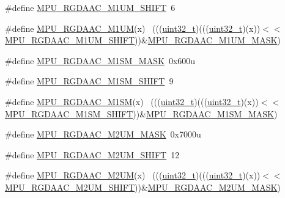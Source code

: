 \begin{DoxyCompactItemize}
\item 
\#define \hyperlink{group___m_p_u___register___masks_gab78a3ecaa69ce9b7a985e4efa7b4620d}{M\+P\+U\+\_\+\+R\+G\+D\+A\+A\+C\+\_\+\+M1\+U\+M\+\_\+\+S\+H\+I\+FT}~6
\item 
\#define \hyperlink{group___m_p_u___register___masks_ga53c71a1269e004bbdd91060144767525}{M\+P\+U\+\_\+\+R\+G\+D\+A\+A\+C\+\_\+\+M1\+UM}(x)                                          ~(((\hyperlink{_p_e___types_8h_a33594304e786b158f3fb30289278f5af}{uint32\+\_\+t})(((\hyperlink{_p_e___types_8h_a33594304e786b158f3fb30289278f5af}{uint32\+\_\+t})(x))$<$$<$\hyperlink{group___m_p_u___register___masks_gab78a3ecaa69ce9b7a985e4efa7b4620d}{M\+P\+U\+\_\+\+R\+G\+D\+A\+A\+C\+\_\+\+M1\+U\+M\+\_\+\+S\+H\+I\+FT}))\&\hyperlink{group___m_p_u___register___masks_ga9c612a4add9fc4bd1e8866fe06d5a0f0}{M\+P\+U\+\_\+\+R\+G\+D\+A\+A\+C\+\_\+\+M1\+U\+M\+\_\+\+M\+A\+SK})
\item 
\#define \hyperlink{group___m_p_u___register___masks_gae1b8caa92c79f5d2c8063322a5648949}{M\+P\+U\+\_\+\+R\+G\+D\+A\+A\+C\+\_\+\+M1\+S\+M\+\_\+\+M\+A\+SK}~0x600u
\item 
\#define \hyperlink{group___m_p_u___register___masks_gaa7b953ee18610f335e223411d85d8cfa}{M\+P\+U\+\_\+\+R\+G\+D\+A\+A\+C\+\_\+\+M1\+S\+M\+\_\+\+S\+H\+I\+FT}~9
\item 
\#define \hyperlink{group___m_p_u___register___masks_ga5689e7ead576f5f6f11da872e038692e}{M\+P\+U\+\_\+\+R\+G\+D\+A\+A\+C\+\_\+\+M1\+SM}(x)                                          ~(((\hyperlink{_p_e___types_8h_a33594304e786b158f3fb30289278f5af}{uint32\+\_\+t})(((\hyperlink{_p_e___types_8h_a33594304e786b158f3fb30289278f5af}{uint32\+\_\+t})(x))$<$$<$\hyperlink{group___m_p_u___register___masks_gaa7b953ee18610f335e223411d85d8cfa}{M\+P\+U\+\_\+\+R\+G\+D\+A\+A\+C\+\_\+\+M1\+S\+M\+\_\+\+S\+H\+I\+FT}))\&\hyperlink{group___m_p_u___register___masks_gae1b8caa92c79f5d2c8063322a5648949}{M\+P\+U\+\_\+\+R\+G\+D\+A\+A\+C\+\_\+\+M1\+S\+M\+\_\+\+M\+A\+SK})
\item 
\#define \hyperlink{group___m_p_u___register___masks_ga8d7b4cc87aa01ac1fc57eee990df39c7}{M\+P\+U\+\_\+\+R\+G\+D\+A\+A\+C\+\_\+\+M2\+U\+M\+\_\+\+M\+A\+SK}~0x7000u
\item 
\#define \hyperlink{group___m_p_u___register___masks_ga1d5c046770993c99be4542472930ca76}{M\+P\+U\+\_\+\+R\+G\+D\+A\+A\+C\+\_\+\+M2\+U\+M\+\_\+\+S\+H\+I\+FT}~12
\item 
\#define \hyperlink{group___m_p_u___register___masks_gac64278901508100a0d6ad9072218bb95}{M\+P\+U\+\_\+\+R\+G\+D\+A\+A\+C\+\_\+\+M2\+UM}(x)                                          ~(((\hyperlink{_p_e___types_8h_a33594304e786b158f3fb30289278f5af}{uint32\+\_\+t})(((\hyperlink{_p_e___types_8h_a33594304e786b158f3fb30289278f5af}{uint32\+\_\+t})(x))$<$$<$\hyperlink{group___m_p_u___register___masks_ga1d5c046770993c99be4542472930ca76}{M\+P\+U\+\_\+\+R\+G\+D\+A\+A\+C\+\_\+\+M2\+U\+M\+\_\+\+S\+H\+I\+FT}))\&\hyperlink{group___m_p_u___register___masks_ga8d7b4cc87aa01ac1fc57eee990df39c7}{M\+P\+U\+\_\+\+R\+G\+D\+A\+A\+C\+\_\+\+M2\+U\+M\+\_\+\+M\+A\+SK})
$$
\end{DoxyCompactItemize}
